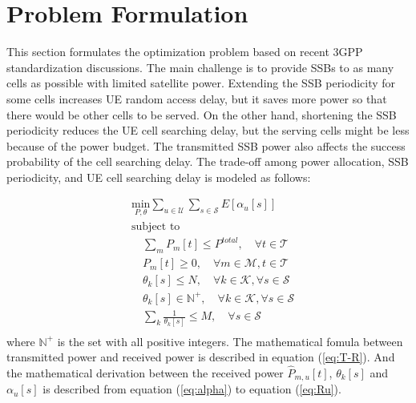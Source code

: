 
\section{Problem Formulation}
This section formulates the optimization problem based on recent 3GPP standardization discussions. The main challenge is to provide SSBs to as many cells as possible with limited satellite power. Extending the SSB periodicity for some cells increases UE random access delay, but it saves more power so that there would be other cells to be served. On the other hand, shortening the SSB periodicity reduces the UE cell searching delay, but the serving cells might be less because of the power budget. The transmitted SSB power also affects the success probability of the cell searching delay. The trade-off among power allocation, SSB periodicity, and UE cell searching delay is modeled as follows:

\begin{equation}
\begin{aligned}
    & \underset{P, \theta}{\text{min}} \sum_{u \in \mathcal{U}} \sum_{s \in \mathcal{S}} E[{\alpha_u[s]}] \\
    & \text{subject to} \\
    & \quad \sum_{m} P_{m}[t] \leq P^{total}, \quad \forall t \in \mathcal{T} \\
    & \quad P_{m}[t] \geq 0, \quad \forall m \in \mathcal{M}, t \in \mathcal{T} \\
    & \quad \theta_k[s] \leq N, \quad \forall k \in \mathcal{K}, \forall s \in \mathcal{S} \\
    & \quad \theta_k[s] \in \mathbb{N}^+, \quad \forall k \in \mathcal{K}, \forall s \in \mathcal{S} \\
    & \quad \sum_{k} \frac{1}{\theta_k[s]} \leq M, \quad \forall s \in \mathcal{S} \\ %
\end{aligned}
\end{equation}
where $\mathbb{N}^+$ is the set with all positive integers. The mathematical fomula between transmitted power and received power is described in equation (\ref{eq:T-R}). And the mathematical derivation between the received power $\hat{P}_{m, u}[t]$, $\theta_k[s]$ and $\alpha_u[s]$ is described from equation (\ref{eq:alpha}) to equation (\ref{eq:Ru}). 


